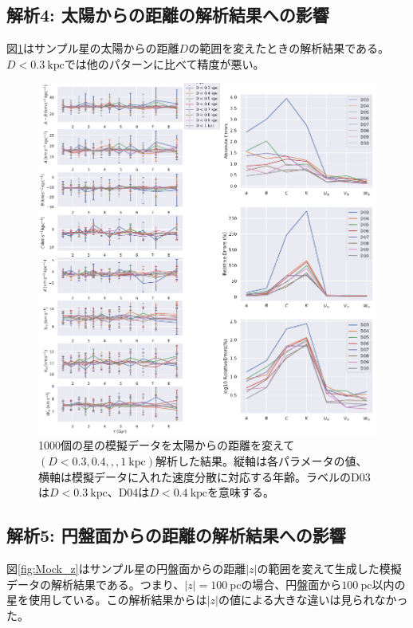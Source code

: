 \subsection{解析4: 太陽からの距離の解析結果への影響}
図\ref{fig:Mock_D}はサンプル星の太陽からの距離$D$の範囲を変えたときの解析結果である。$D<0.3\ \mathrm{kpc}$では他のパターンに比べて精度が悪い。
\begin{figure}[htbp]
	\centering
	\includegraphics[width=15cm]{fig/Mock_D.pdf}
	\caption{1000個の星の模擬データを太陽からの距離を変えて$(D<0.3,0.4,,,1\  \mathrm{kpc})$解析した結果。縦軸は各パラメータの値、横軸は模擬データに入れた速度分散に対応する年齢。ラベルのD03は$D<0.3\ \mathrm{kpc}$、D04は$D<0.4\ \mathrm{kpc}$を意味する。} \label{fig:Mock_D}
\end{figure}


\subsection{解析5: 円盤面からの距離の解析結果への影響}
図\ref{fig:Mock_z}はサンプル星の円盤面からの距離$|z|$の範囲を変えて生成した模擬データの解析結果である。つまり、$|z|=100\ \mathrm{pc}$の場合、円盤面から$100\ \mathrm{pc}$以内の星を使用している。この解析結果からは$|z|$の値による大きな違いは見られなかった。

